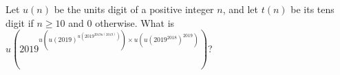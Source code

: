 Let $u(n)$ be the units digit of a positive integer $n$, and let $t(n)$ be its tens digit if $n\ge10$ and $0$ otherwise. What is $\displaystyle u\left(2019^{u(u(2019)^{u(2019^{2019 u(2019)})}) \times u(u(2019^{2018})^{2019})}\right)$?

